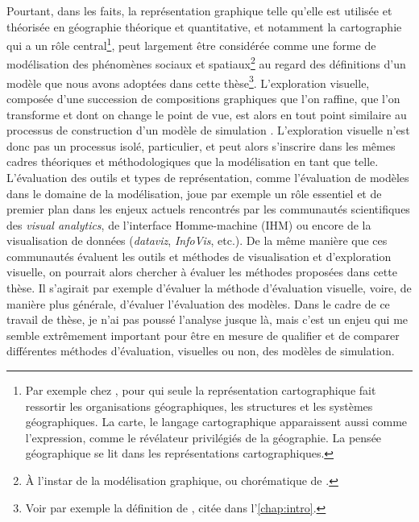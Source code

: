Pourtant, dans les faits, la représentation graphique telle qu'elle est utilisée et théorisée en géographie théorique et quantitative, et notamment la cartographie qui a un rôle central\footnote{
	Par exemple chez \textcite[246--247]{pinchemel_geographie_1979}, pour qui \og seule la représentation cartographique fait ressortir les organisations géographiques, les structures et les systèmes géographiques.
	La carte, le langage cartographique apparaissent aussi comme l'expression, comme le révélateur privilégiés de la géographie.
	La pensée géographique se lit dans les représentations cartographiques\fg{}.
}, peut largement être considérée comme une forme de modélisation des phénomènes sociaux et spatiaux\footnote{
	À l'instar de la \og modélisation graphique\fg{}, ou chorématique de \textcite{brunet1980composition}.
} au regard des définitions d'un modèle que nous avons adoptées dans cette thèse\footnote{
	Voir par exemple la définition de \textcite{minsky_matter_1965}, citée dans l'\cref{chap:intro}.	
}.
L'exploration visuelle, composée d'une succession de compositions graphiques que l'on raffine, que l'on transforme et dont on change le point de vue, est alors en tout point similaire au processus de construction d'un modèle de simulation \autocite{andrienko2018viewing}.
L'exploration visuelle n'est donc pas un processus isolé, particulier, et peut alors s'inscrire dans les mêmes cadres théoriques et méthodologiques que la modélisation en tant que telle.
L'évaluation des outils et types de représentation, comme l'évaluation de modèles dans le domaine de la modélisation, joue par exemple un rôle essentiel et de premier plan dans les enjeux actuels rencontrés par les communautés scientifiques des \textit{visual analytics}, de l'interface Homme-machine (IHM) ou encore de la visualisation de données (\textit{dataviz}, \textit{InfoVis}, etc.).
De la même manière que ces communautés évaluent les outils et méthodes de visualisation et d'exploration visuelle, on pourrait alors chercher à évaluer les méthodes proposées dans cette thèse.
Il s'agirait par exemple d'évaluer la méthode d'évaluation visuelle, voire, de manière plus générale, d'évaluer l'évaluation des modèles.
Dans le cadre de ce travail de thèse, je n'ai pas poussé l'analyse jusque là, mais c'est un enjeu qui me semble extrêmement important pour être en mesure de qualifier et de comparer différentes méthodes d'évaluation, visuelles ou non, des modèles de simulation.

